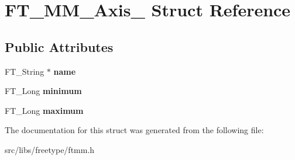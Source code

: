 \hypertarget{struct_f_t___m_m___axis__}{
\section{FT\_\-MM\_\-Axis\_\- Struct Reference}
\label{struct_f_t___m_m___axis__}
}
\subsection*{Public Attributes}
\begin{DoxyCompactItemize}
\item 
\hypertarget{struct_f_t___m_m___axis___a5c784efa44906c0e2b715eb1f866a09f}{
FT\_\-String $\ast$ {\bfseries name}}
\label{struct_f_t___m_m___axis___a5c784efa44906c0e2b715eb1f866a09f}

\item 
\hypertarget{struct_f_t___m_m___axis___a9dc31f02b350b1356e0896673b5b73a4}{
FT\_\-Long {\bfseries minimum}}
\label{struct_f_t___m_m___axis___a9dc31f02b350b1356e0896673b5b73a4}

\item 
\hypertarget{struct_f_t___m_m___axis___addac1f8e71da1bedea9b393ae2751881}{
FT\_\-Long {\bfseries maximum}}
\label{struct_f_t___m_m___axis___addac1f8e71da1bedea9b393ae2751881}

\end{DoxyCompactItemize}


The documentation for this struct was generated from the following file:\begin{DoxyCompactItemize}
\item 
src/libs/freetype/ftmm.h\end{DoxyCompactItemize}
